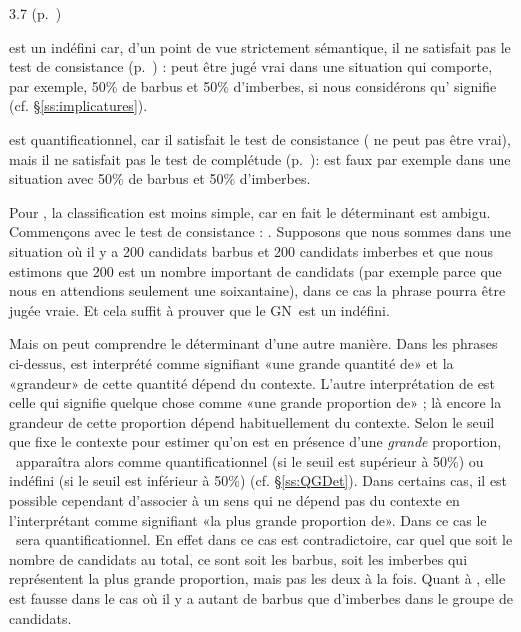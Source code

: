 \begin{Solution}{3.{7}}
(p.~\pageref{exo:CatGN})\label{crg:CatGN}

 est un indéfini car, d'un point de vue strictement sémantique, il ne satisfait pas le test de consistance (p.~\pageref{test:contra}) :  peut être jugé vrai dans une situation qui comporte, par exemple, 50\% de barbus et 50\% d'imberbes, si nous considérons qu' signifie  (cf. \S\ref{ss:implicatures}).

 est quantificationnel, car il satisfait le test de consistance ( ne peut pas être vrai), mais il ne satisfait pas le test de complétude (p.~\pageref{test:compl}):  est faux par exemple dans une situation avec 50\% de barbus et 50\% d'imberbes.

Pour , la classification est moins simple, car en fait le déterminant est ambigu.  Commençons avec le test de consistance : .  Supposons que nous sommes dans une situation où il y a 200 candidats barbus et 200 candidats imberbes et que nous estimons que 200 est un nombre important de candidats (par exemple parce que nous en attendions seulement une soixantaine), dans ce cas la phrase pourra être jugée vraie.  Et cela suffit à prouver que le GN\ est un indéfini.

Mais on peut comprendre le déterminant  d'une
autre manière. Dans les phrases ci-dessus,  est
interprété comme signifiant «une grande quantité de» et la
«grandeur» de cette quantité dépend du contexte. L'autre interprétation de
 est celle qui signifie quelque chose comme «une grande proportion de» ; là encore la grandeur de cette proportion dépend habituellement du contexte.  Selon le seuil que fixe le contexte pour estimer qu'on est en présence d'une \emph{grande} proportion,  \GN\ apparaîtra alors comme quantificationnel (si le seuil est supérieur à 50\%) ou indéfini (si le seuil est inférieur à 50\%) (cf. \S\ref{ss:QGDet}).   Dans certains cas, il est possible cependant d'associer à  un sens qui ne dépend pas du contexte en l'interprétant comme signifiant «la plus grande proportion de».  Dans ce cas le \GN\ sera quantificationnel.  En
effet dans ce cas  est contradictoire, car quel que soit le
nombre de candidats au total, ce sont soit les barbus, soit les
imberbes qui représentent la plus grande proportion, mais pas les deux
à la fois.  Quant à , elle est fausse dans le cas où il y a
autant de barbus que d'imberbes dans le groupe de candidats.
\end{Solution}
